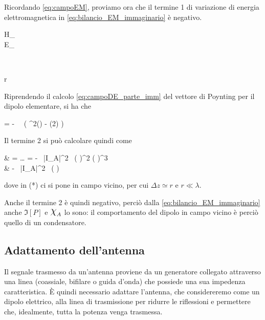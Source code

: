 Ricordando \autoref{eq:campoEM}, proviamo ora che il termine 1 di variazione di energia elettromagnetica in \autoref{eq:bilancio_EM_immaginario} è negativo.
\begin{esp*}
	\begin{dcases}
		H_\phi \propto {} \\
		E_\theta \propto {}
	\end{dcases}
	\implies
	\begin{dcases}
		 \simeq \frac{\mu}{r^2} \\
		 \simeq \frac{\mu}{r^6}
	\end{dcases}
	\implies {} \gg {}
	 r \ll \lambda
\end{esp*}

Riprendendo il calcolo \autoref{eq:campoDE_parte_imm} del vettore di Poynting per il dipolo elementare, si ha che
\begin{esp*}
	\Im[\P]
	= - 
	\,  \,
	\left(
		\sin^2(\theta) \hr
		- \sin(2\theta) \hth
	\right)
\end{esp*}

Il termine 2 si può calcolare quindi come
\begin{esp*}
	\Im{}
	& = \ldots
	= -  \, |I_A|^2 \,
	\left(  \right)^2
	\left(  \right)^3 \\
	& \stackrel{(*)}{\simeq} -  \, |I_A|^2 \,
	\left(  \right)
	 
\end{esp*}
dove in (*) ci si pone in campo vicino, per cui $\Delta z \simeq r$ e $r \ll \lambda$.

Anche il termine 2 è quindi negativo, perciò dalla \autoref{eq:bilancio_EM_immaginario} anche $\Im[P]$ e $\Chi_A$ lo sono: il comportamento del dipolo in campo vicino è perciò quello di un condensatore.

\subsection{Adattamento dell'antenna}
Il segnale trasmesso da un'antenna proviene da un generatore collegato attraverso una linea (coassiale, bifilare o guida d'onda) che possiede una sua impedenza caratteristica. È quindi necessario adattare l'antenna, che considereremo come un dipolo elettrico, alla linea di trasmissione per ridurre le riflessioni e permettere che, idealmente, tutta la potenza venga trasmessa.

